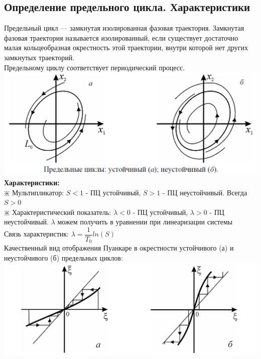 \begin{multicols*}{2}
		\section{Определение предельного цикла. Характеристики}
		Предельный цикл — замкнутая изолированная фазовая траектория. Замкнутая фазовая траектория называется изолированный, если существует достаточно малая кольцеобразная окрестность этой траектории, внутри которой нет других замкнутых траекторий.\\
		Предельному циклу соответствует периодический процесс.\\
		\includegraphics[width=0.7\linewidth]{tk_img/predel.png}\\
		\textbf{Характеристики:}\\
		$\divideontimes$ Мультипликатор: $S<1$ - ПЦ устойчивый, $S>1$ - ПЦ неустойчивый. Всегда $S>0$\\
		$\divideontimes$ Характеристический показатель: $\lambda<0$ - ПЦ устойчивый, $\lambda>0$ - ПЦ неустойчивый. $\lambda$ можем получить в уравнении при линеаризации системы\\
		Связь характеристик: $\lambda = \dfrac{1}{T_0}ln(S)$ \\
		Качественный вид отображения Пуанкаре в окрестности устойчивого (а) и неустойчивого (б) предельных циклов: \\
		{\includegraphics[width=0.7\linewidth]{tk_img/predel_puankare.png}}
		

\end{multicols*}
